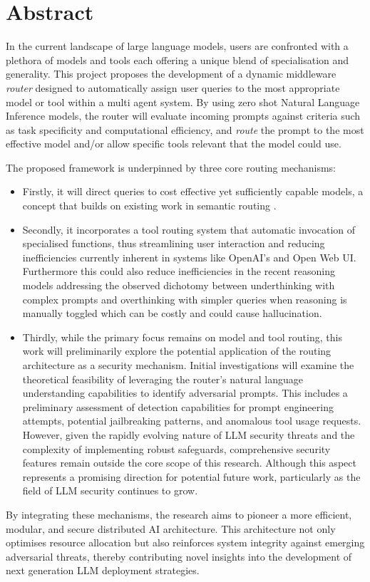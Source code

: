 \chapter*{\center \Large  Abstract}

\noindent In the current landscape of large language models, users are confronted with a plethora of models and tools each offering a unique blend of specialisation and generality. This project proposes the development of a dynamic middleware \textit{router} designed to automatically assign user queries to the most appropriate model or tool within a multi agent system. By using zero shot Natural Language Inference models, the router will evaluate incoming prompts against criteria such as task specificity and computational efficiency, and \textit{route} the prompt to the most effective model and/or allow specific tools relevant that the model could use.

The proposed framework is underpinned by three core routing mechanisms:

\begin{itemize}
    \item Firstly, it will direct queries to cost effective yet sufficiently capable models, a concept that builds on existing work in semantic routing \cite{ong2025routellmlearningroutellms}.
    
    \item Secondly, it incorporates a tool routing system that automatic invocation of specialised functions, thus streamlining user interaction and reducing inefficiencies currently inherent in systems like OpenAI's and Open Web UI. Furthermore this could also reduce inefficiencies in the recent reasoning models addressing the observed dichotomy between underthinking with complex prompts and overthinking with simpler queries when reasoning is manually toggled which can be costly and could cause hallucination.
    
    \item Thirdly, while the primary focus remains on model and tool routing, this work will preliminarily explore the potential application of the routing architecture as a security mechanism. Initial investigations will examine the theoretical feasibility of leveraging the router's natural language understanding capabilities to identify adversarial prompts. This includes a preliminary assessment of detection capabilities for prompt engineering attempts, potential jailbreaking patterns, and anomalous tool usage requests. However, given the rapidly evolving nature of LLM security threats and the complexity of implementing robust safeguards, comprehensive security features remain outside the core scope of this research. Although this aspect represents a promising direction for potential future work, particularly as the field of LLM security continues to grow.
\end{itemize}

\noindent By integrating these mechanisms, the research aims to pioneer a more efficient, modular, and secure distributed AI architecture. This architecture not only optimises resource allocation but also reinforces system integrity against emerging adversarial threats, thereby contributing novel insights into the development of next generation LLM deployment strategies.